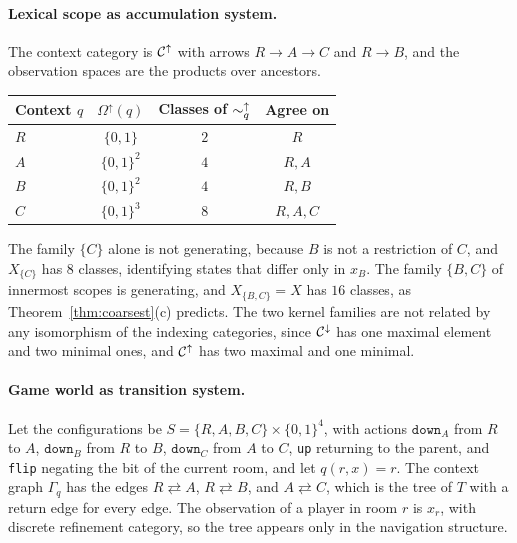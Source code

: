 \paragraph{Lexical scope as accumulation system.} The context category is $\mathcal C^{\uparrow}$ with arrows $R\to A\to C$ and $R\to B$, and the observation spaces are the products over ancestors.
\begin{center}
\begin{tabular}{lccc}
\toprule
Context $q$ & $\Omega^{\uparrow}(q)$ & Classes of $\sim^{\uparrow}_q$ & Agree on\\
\midrule
$R$ & $\{0,1\}$ & $2$ & $R$\\
$A$ & $\{0,1\}^2$ & $4$ & $R,A$\\
$B$ & $\{0,1\}^2$ & $4$ & $R,B$\\
$C$ & $\{0,1\}^3$ & $8$ & $R,A,C$\\
\bottomrule
\end{tabular}
\end{center}
The family $\{C\}$ alone is not generating, because $B$ is not a restriction of $C$, and $X_{\{C\}}$ has $8$ classes, identifying states that differ only in $x_B$. The family $\{B,C\}$ of innermost scopes is generating, and $X_{\{B,C\}}=X$ has $16$ classes, as Theorem~\ref{thm:coarsest}(c) predicts. The two kernel families are not related by any isomorphism of the indexing categories, since $\mathcal C^{\downarrow}$ has one maximal element and two minimal ones, and $\mathcal C^{\uparrow}$ has two maximal and one minimal.

\paragraph{Game world as transition system.} Let the configurations be $S=\{R,A,B,C\}\times\{0,1\}^4$, with actions $\texttt{down}_A$ from $R$ to $A$, $\texttt{down}_B$ from $R$ to $B$, $\texttt{down}_C$ from $A$ to $C$, \texttt{up} returning to the parent, and \texttt{flip} negating the bit of the current room, and let $q(r,x)=r$. The context graph $\Gamma_q$ has the edges $R\rightleftarrows A$, $R\rightleftarrows B$, and $A\rightleftarrows C$, which is the tree of $T$ with a return edge for every edge. The observation of a player in room $r$ is $x_r$, with discrete refinement category, so the tree appears only in the navigation structure.

